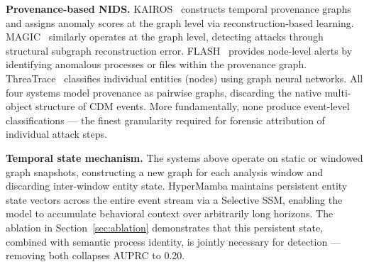 \documentclass[letterpaper,twocolumn,10pt]{article}
\begin{document}
\begin{table}[t]
    \centering
    \caption{Positioning of HyperMamba against provenance-based NIDS on three axes.}
    \label{tab:positioning}
\end{table}

\textbf{Provenance-based NIDS.} KAIROS~\cite{cheng2024kairos} constructs temporal provenance graphs and assigns anomaly scores at the graph level via reconstruction-based learning. MAGIC~\cite{jia2024magic} similarly operates at the graph level, detecting attacks through structural subgraph reconstruction error. FLASH~\cite{rehman2024flash} provides node-level alerts by identifying anomalous processes or files within the provenance graph. ThreaTrace~\cite{Wang2021THREATRACEDA} classifies individual entities (nodes) using graph neural networks. All four systems model provenance as pairwise graphs, discarding the native multi-object structure of CDM events. More fundamentally, none produce event-level classifications --- the finest granularity required for forensic attribution of individual attack steps.

\textbf{Temporal state mechanism.} The systems above operate on static or windowed graph snapshots, constructing a new graph for each analysis window and discarding inter-window entity state. HyperMamba maintains persistent entity state vectors across the entire event stream via a Selective SSM, enabling the model to accumulate behavioral context over arbitrarily long horizons. The ablation in Section~\ref{sec:ablation} demonstrates that this persistent state, combined with semantic process identity, is jointly necessary for detection --- removing both collapses AUPRC to 0.20.
\end{document}
